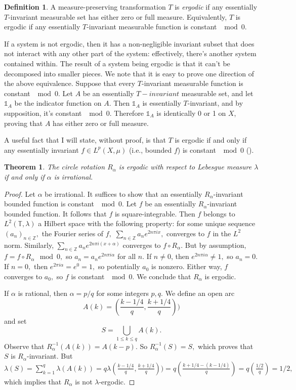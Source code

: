 \documentclass[12pt, letterpaper, oneside]{book}
\newcommand{\ga}{\ensuremath{\alpha}}
\newcommand{\gl}{\ensuremath{\lambda}}
\newcommand{\Z}{\mathbb{Z}}
\newcommand{\T}{\mathbb{T}}
\theoremstyle{plain}
\newtheorem{theorem}{Theorem}
\theoremstyle{definition}
\newtheorem{definition}{Definition}
\theoremstyle{remark}
\begin{document}
\begin{definition}
A measure-preserving transformation $T$ is \textit{ergodic} if any essentially $T$-invariant measurable set has either zero or full measure. Equivalently, $T$ is ergodic if any essentially $T$-invariant measurable function is constant $\mod 0.$ 
\end{definition}

If a system is not ergodic, then it has a non-negligible invariant subset that does not interact with any other part of the system: effectively, there's another system contained within. The result of a system being ergodic is that it can't be decomposed into smaller pieces. We note that it is easy to prove one direction of the above equivalence. Suppose that every $T$-invariant measurable function is constant $\mod 0.$ Let $A$ be an essentially $T-invariant$ measurable set, and let $\mathds{1}_A$ be the indicator function on $A.$ Then $\mathds{1}_A$ is essentially $T$-invariant, and by supposition, it's constant $\mod 0.$ Therefore $\mathds{1}_A$ is identically 0 or 1 on $X$, proving that $A$ has either zero or full measure.

 A useful fact that I will state, without proof, is that $T$ is ergodic if and only if any essentially invariant $f \in L^p(X, \mu)$ (i.e., bounded $f$) is constant $\mod 0$ (\cite{MB02}).
 
 \begin{theorem}
 The circle rotation $R_\ga$ is ergodic with respect to Lebesgue measure $\lambda$ if and only if $\ga$ is irrational.
 \end{theorem}
 \begin{proof}
 Let $\ga$ be irrational. It suffices to show that an essentially $R_\ga$-invariant bounded function is constant $\mod 0.$ Let $f$ be an essentially $R_\ga$-invariant bounded function. It follows that $f$ is square-integrable. Then $f$ belongs to $L^2(\T,\lambda)$ a Hilbert space with the following property: for some unique sequence $(a_n)_{n\in \Z},$ the Fourier series of $f,$ $\sum_{n \in \Z} a_ne^{2n\pi ix},$ converges to $f$ in the $L^2$ norm. Similarly, $\sum_{n \in \Z} a_ne^{2n\pi i(x+\ga)}$ converges to  $f \circ R_\ga.$ But by assumption, $f = f \circ R_\ga \mod 0,$ so 
 $a_n = a_ne^{2n\pi i\ga}$ for all $n.$ If $n \neq 0$, then $e^{2n\pi i \ga} \neq 1,$ so $a_n = 0.$ If $n = 0,$ then $e^{2\pi i \ga} = e^0 = 1,$ so potentially $a_0$ is nonzero. Either way, $f$ converges to $a_0,$ so $f$ is constant $\mod 0.$ We conclude that $R_\ga$ is ergodic.
 
 If $\ga$ is rational, then $\ga = p/q$ for some integers $p,q.$ We define an open arc 
 \[
 A(k) = (\frac{k-1/4}{q},\frac{k+1/4}{q}))
 \]
 and set 
 \[
 S = \bigcup_{1\leq k \leq q}A(k).
 \]
 Observe that $R_\ga^{-1}(A(k)) = A(k -p).$  So $R_\ga^{-1}(S) = S,$ which proves  that $S$ is $R_\ga$-invariant. But $\gl(S) = \sum_{k=1}^{q}\gl(A(k)) = q\gl(\frac{k-1/4}{q},\frac{k+1/4}{q})) = q(\frac{k +1/4 - (k-1/4)}{q}) = q(\frac{1/2}{q}) = 1/2,$ which implies that $R_\ga$ is not $\gl$-ergodic.
  \end{proof}
 
\end{document}
